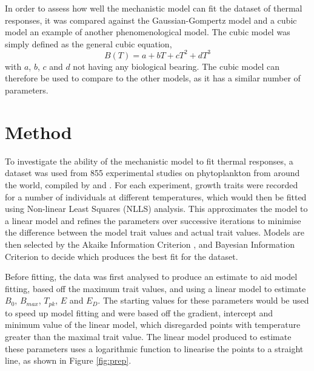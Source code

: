 \documentclass[11pt]{article}
\begin{document}
In order to assess how well the mechanistic model can fit the dataset of thermal responses, it was compared against the Gaussian-Gompertz model and a cubic model an example of another phenomenological model. The cubic model was simply defined as the general cubic equation,
\begin{equation}
	B(T)=a + bT + cT^2 + dT^3
\end{equation}
with \(a\), \(b\), \(c\) and \(d\) not having any biological bearing. The cubic model can therefore be used to compare to the other models, as it has a similar number of parameters.


\section{Method}
To investigate the ability of the mechanistic model to fit thermal responses, a dataset was used from 855 experimental studies on phytoplankton from around the world, compiled by \cite{Chen2010a} and \cite{Thomas2012a}. For each experiment, growth traits were recorded for a number of individuals at different temperatures, which would then be fitted using Non-linear Least Squares (NLLS) analysis. This approximates the model to a linear model and refines the parameters over successive iterations to minimise the difference between the model trait values and actual trait values. Models are then selected by the Akaike Information Criterion \citep{Akaike1973}, and Bayesian Information Criterion \citep{Schwarz1978} to decide which produces the best fit for the dataset.

Before fitting, the data was first analysed to produce an estimate to aid model fitting, based off the maximum trait values, and using a linear model to estimate \(B_0\), \(B_{max}\), \(T_{pk}\), \(E\) and \(E_D\). The starting values for these parameters would be used to speed up model fitting and were based off the gradient, intercept and minimum value of the linear model, which disregarded points with temperature greater than the maximal trait value. The linear model produced to estimate these parameters uses a logarithmic function to linearise the points to a straight line, as shown in Figure \ref{fig:prep}.
\end{document}
